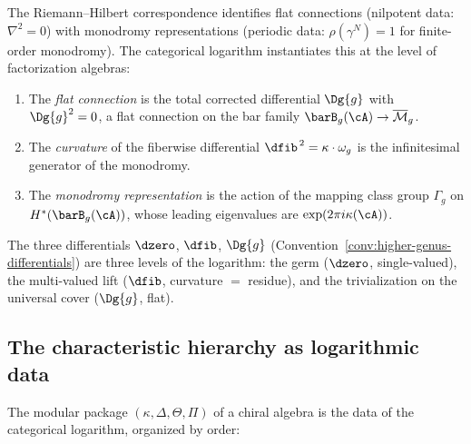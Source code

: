 \begin{remark}
\label{rem:chiral-rh-revisited}
The Riemann--Hilbert correspondence identifies flat connections
(nilpotent data: $\nabla^2 = 0$) with monodromy representations
(periodic data: $\rho(\gamma^N) = 1$ for finite-order monodromy).
The categorical logarithm instantiates this at the level of
factorization algebras:
\begin{enumerate}[label=(\roman*)]
\item The \emph{flat connection} is the total corrected differential
$\Dg{g}$ with $\Dg{g}^2 = 0$, a flat connection on the bar family
$\barB_g(\cA) \to \overline{\mathcal{M}}_g$.
\item The \emph{curvature} of the fiberwise differential
$\dfib^{\,2} = \kappa \cdot \omega_g$ is the infinitesimal generator
of the monodromy.
\item The \emph{monodromy representation} is the action of the mapping
class group $\Gamma_g$ on $H^*(\barB_g(\cA))$, whose leading
eigenvalues are $\exp(2\pi i \kappa(\cA))$.
\end{enumerate}
The three differentials $\dzero$, $\dfib$, $\Dg{g}$
(Convention~\ref{conv:higher-genus-differentials}) are three levels of
the logarithm: the germ ($\dzero$, single-valued), the
multi-valued lift ($\dfib$, curvature $= $ residue), and the
trivialization on the universal cover ($\Dg{g}$, flat).
\end{remark}

\subsection{The characteristic hierarchy as logarithmic data}
\label{subsec:characteristic-log}

The modular package $(\kappa, \Delta, \Theta, \Pi)$ of a chiral
algebra is the data of the categorical logarithm, organized by order:

